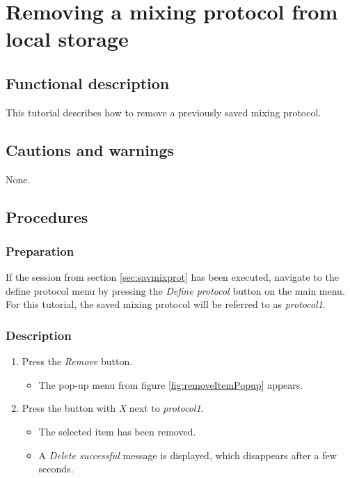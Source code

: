 \section{Removing a mixing protocol from local storage}\label{sec:remmixprot}

\subsection{Functional description}
This tutorial describes how to remove a previously saved mixing protocol.

\subsection{Cautions and warnings}
None.

\subsection{Procedures}

\subsubsection{Preparation}
If the session from section \ref{sec:savmixprot} has been executed, navigate to the define protocol menu by pressing the \emph{Define protocol} button on the main menu. 
For this tutorial, the saved mixing protocol will be referred to as \emph{protocol1}.

\subsubsection{Description}
\begin{enumerate}
	\item Press the \emph{Remove} button.
		\begin{itemize}
			\item The pop-up menu from figure \ref{fig:removeItemPopup} appears.
		\end{itemize}
	\item Press the button with \emph{X} next to \emph{protocol1}.
		\begin{itemize}
			\item The selected item has been removed.
			\item A \emph{Delete successful} message is displayed, which disappears after a few seconds.
		\end{itemize}
\end{enumerate}

